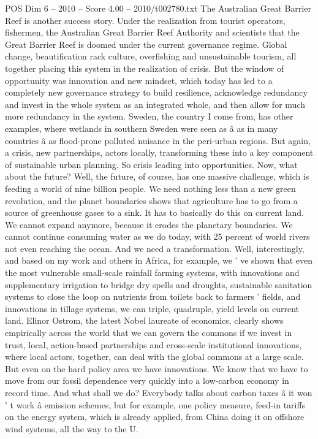 \begin{textsample}{POS Dim 6 – 2010 – Score 4.00 – 2010/t002780.txt}
The Australian Great Barrier Reef is another success story.
Under the realization from tourist operators, fishermen, the Australian Great Barrier Reef Authority and scientists that the Great Barrier Reef is doomed under the current governance regime.
Global change, beautification rack culture, overfishing and unsustainable tourism, all together placing this system in the realization of crisis.
But the window of opportunity was innovation and new mindset, which today has led to a completely new governance strategy to build resilience, acknowledge redundancy and invest in the whole system as an integrated whole, and then allow for much more redundancy in the system.
Sweden, the country I come from, has other examples, where wetlands in southern Sweden were seen as â as in many countries â as flood-prone polluted nuisance in the peri-urban regions.
But again, a crisis, new partnerships, actors locally, transforming these into a key component of sustainable urban planning.
So crisis leading into opportunities.
Now, what about the future?
Well, the future, of course, has one massive challenge, which is feeding a world of nine billion people.
We need nothing less than a new green revolution, and the planet boundaries shows that agriculture has to go from a source of greenhouse gases to a sink.
It has to basically do this on current land.
We cannot expand anymore, because it erodes the planetary boundaries.
We cannot continue consuming water as we do today, with 25 percent of world rivers not even reaching the ocean.
And we need a transformation.
Well, interestingly, and based on my work and others in Africa, for example, we ' ve shown that even the most vulnerable small-scale rainfall farming systems, with innovations and supplementary irrigation to bridge dry spells and droughts, sustainable sanitation systems to close the loop on nutrients from toilets back to farmers ' fields, and innovations in tillage systems, we can triple, quadruple, yield levels on current land.
Elinor Ostrom, the latest Nobel laureate of economics, clearly shows empirically across the world that we can govern the commons if we invest in trust, local, action-based partnerships and cross-scale institutional innovations, where local actors, together, can deal with the global commons at a large scale.
But even on the hard policy area we have innovations.
We know that we have to move from our fossil dependence very quickly into a low-carbon economy in record time.
And what shall we do?
Everybody talks about carbon taxes â it won ' t work â emission schemes, but for example, one policy measure, feed-in tariffs on the energy system, which is already applied, from China doing it on offshore wind systems, all the way to the U.

\end{textsample}
